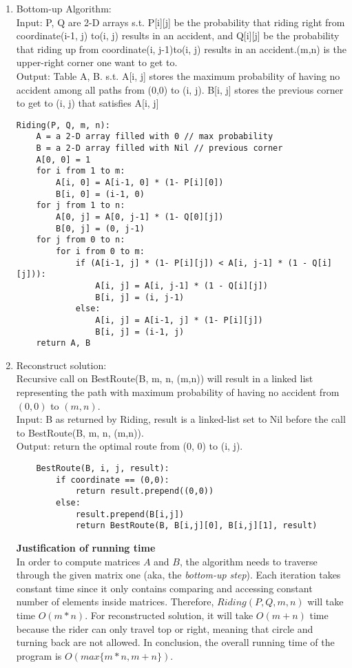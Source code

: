 \documentclass[11pt]{article}
\begin{document}
\begin{enumerate}
\begin{enumerate}
        \item Bottom-up Algorithm:\\
        Input: P, Q are 2-D arrays s.t. P[i][j] be the probability that riding right from coordinate(i-1, j) to(i, j) results in an accident, and Q[i][j] be the probability that riding up from coordinate(i, j-1)to(i, j) results in an accident.(m,n) is the upper-right corner one want to get to.\\
        Output: Table A, B. s.t. A[i, j] stores the maximum probability of having no accident among all paths from (0,0) to (i, j). B[i, j] stores the previous corner to get to (i, j) that satisfies A[i, j]
            \begin{lstlisting}
Riding(P, Q, m, n):
    A = a 2-D array filled with 0 // max probability
    B = a 2-D array filled with Nil // previous corner
    A[0, 0] = 1
    for i from 1 to m:
        A[i, 0] = A[i-1, 0] * (1- P[i][0])
        B[i, 0] = (i-1, 0)
    for j from 1 to n:
        A[0, j] = A[0, j-1] * (1- Q[0][j])
        B[0, j] = (0, j-1)
    for j from 0 to n:
        for i from 0 to m:
            if (A[i-1, j] * (1- P[i][j]) < A[i, j-1] * (1 - Q[i][j])):
                A[i, j] = A[i, j-1] * (1 - Q[i][j])
                B[i, j] = (i, j-1)
            else:
                A[i, j] = A[i-1, j] * (1- P[i][j])
                B[i, j] = (i-1, j)
    return A, B
            \end{lstlisting}
        \item Reconstruct solution: \\
        Recursive call on BestRoute(B, m, n, (m,n)) will result in a linked list representing the path with maximum probability of having no accident from $(0,0)$ to $(m,n)$.\\[2ex]
        Input: B as returned by Riding, result is a linked-list set to Nil before the call to BestRoute(B, m, n, (m,n)).\\
        Output: return the optimal route from (0, 0) to (i, j).\\
            \begin{lstlisting}
    BestRoute(B, i, j, result):
        if coordinate == (0,0):
            return result.prepend((0,0))
        else:
            result.prepend(B[i,j])
            return BestRoute(B, B[i,j][0], B[i,j][1], result)
            \end{lstlisting}

            \textbf{Justification of running time}\\
            In order to compute matrices $A$ and $B$, the algorithm needs to traverse through the given matrix one (aka, the \textit{bottom-up step}). Each iteration takes constant time since it only contains comparing and accessing constant number of elements inside matrices. Therefore, $Riding(P,Q,m,n)$ will take time $O(m*n)$. For reconstructed solution, it will take $O(m+n)$ time because the rider can only travel top or right, meaning that circle and turning back are not allowed. In conclusion, the overall running time of the program is $O(max\{ m*n, m+n \})$.
    \end{enumerate}
    

\end{enumerate}
\end{document}
